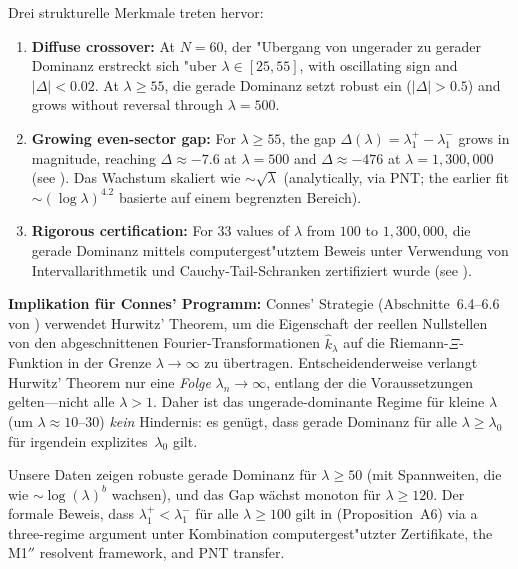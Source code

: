 \documentclass[12pt,a4paper]{article}
\theoremstyle{definition}
\theoremstyle{remark}
\begin{document}
Drei strukturelle Merkmale treten hervor:

\begin{enumerate}
  \item \textbf{Diffuse crossover:} At $N=60$, der "Ubergang von ungerader zu gerader Dominanz erstreckt sich "uber $\lambda \in [25, 55]$, with oscillating sign and $|\Delta| < 0.02$. At $\lambda \geq 55$, die gerade Dominanz setzt robust ein ($|\Delta| > 0.5$) and grows without reversal through $\lambda = 500$.

  \item \textbf{Growing even-sector gap:} For $\lambda \geq 55$, the gap $\Delta(\lambda) = \lambda_1^+ - \lambda_1^-$ grows in magnitude, reaching $\Delta \approx -7.6$ at $\lambda = 500$ and $\Delta \approx -476$ at $\lambda = 1{,}300{,}000$ (see ). Das Wachstum skaliert wie $\sim\!\sqrt{\lambda}$ (analytically, via PNT; the earlier fit $\sim\!(\log\lambda)^{4.2}$ basierte auf einem begrenzten Bereich).

  \item \textbf{Rigorous certification:} For $33$ values of $\lambda$ from $100$ to $1{,}300{,}000$, die gerade Dominanz mittels computergest"utztem Beweis unter Verwendung von Intervallarithmetik und Cauchy-Tail-Schranken zertifiziert wurde (see ).
\end{enumerate}

\textbf{Implikation für Connes' Programm:} Connes' Strategie (Abschnitte~6.4--6.6 von \cite{Connes2026}) verwendet Hurwitz' Theorem, um die Eigenschaft der reellen Nullstellen von den abgeschnittenen Fourier-Transformationen $\hat{k}_\lambda$ auf die Riemann-$\Xi$-Funktion in der Grenze $\lambda \to \infty$ zu übertragen. Entscheidenderweise verlangt Hurwitz' Theorem nur eine \emph{Folge} $\lambda_n \to \infty$, entlang der die Voraussetzungen gelten---nicht alle $\lambda > 1$. Daher ist das ungerade-dominante Regime für kleine $\lambda$ (um $\lambda \approx 10$--$30$) \emph{kein} Hindernis: es genügt, dass gerade Dominanz für alle $\lambda \geq \lambda_0$ für irgendein explizites~$\lambda_0$ gilt.

Unsere Daten zeigen robuste gerade Dominanz für $\lambda \geq 50$ (mit Spannweiten, die wie $\sim \log(\lambda)^b$ wachsen), und das Gap wächst monoton für $\lambda \geq 120$. Der formale Beweis, dass $\lambda_1^+ < \lambda_1^-$ für alle $\lambda \geq 100$ gilt in  (Proposition~A6) via a three-regime argument unter Kombination computergest"utzter Zertifikate, the M1$''$ resolvent framework, and PNT transfer.
\end{document}
